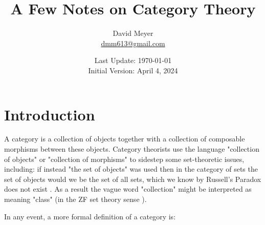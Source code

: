 \documentclass{article}
\title{A Few Notes on Category Theory}
\author{David Meyer \\ \href{mailto:dmm613@gmail.com}
                            {dmm613@gmail.com}}
\date{Last Update: \today \\
	 {\vspace{1.00mm} \small Initial Version: April 4, 2024}}
\theoremstyle{definition}
\begin{document}
\maketitle
%
%
%
\section{Introduction}
\label{section:introduction}
A category is a collection of objects together with a collection
of composable morphisms between these objects.  Category
theorists use the language "collection of objects" or "collection
of morphisms" to sidestep some set-theoretic issues, including:
if instead "the set of objects" was used then in the category of
sets the set of objects would we be the set of all sets, which we
know by Russell's Paradox does not exist
\cite{russells_paradox}. As a result the vague word "collection"
might be interpreted as meaning "class" (in the ZF set theory
sense \cite{zf_set_theory}).


\bigskip
\noindent
In any event, a more formal definition of a category is: 
\end{document}
